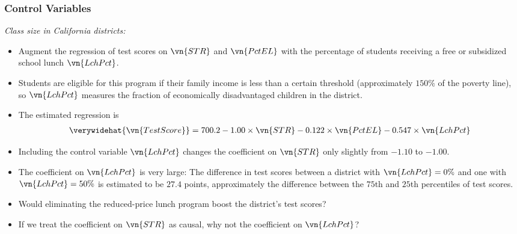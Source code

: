 \begin{frame}
\frametitle{Control Variables}
\emph{Class size in California districts:}
\begin{itemize}
\item Augment the regression of test scores on $\vn{STR}$ and $\vn{PctEL}$ with the percentage of students receiving a free or subsidized school lunch $\vn{LchPct}$. 
\item Students are eligible for this program if their family income is less than a certain threshold (approximately $150\%$ of the poverty line), so $\vn{LchPct}$ measures the fraction of economically disadvantaged children in the district. 
\item The estimated regression is
\begin{align*}
\verywidehat{\vn{TestScore}} 
  = 700.2 - 1.00 \times \vn{STR} - 0.122 \times \vn{PctEL} - 0.547 \times \vn{LchPct}
\end{align*} 
\item Including the control variable $\vn{LchPct}$ changes the coefficient on $\vn{STR}$ only slightly from $-1.10$ to $-1.00$.
\item The coefficient on $\vn{LchPct}$ is very large: The difference in test scores between a district with $\vn{LchPct}=0\%$ and one with $\vn{LchPct}=50\%$ is estimated to be $27.4$ points, approximately the difference between the $75$th and $25$th percentiles of test scores. 
\item Would eliminating the reduced-price lunch program boost the district's test scores?
\item If we treat the coefficient on $\vn{STR}$ as causal, why not the coefficient on $\vn{LchPct}$?
\end{itemize}
\end{frame}


